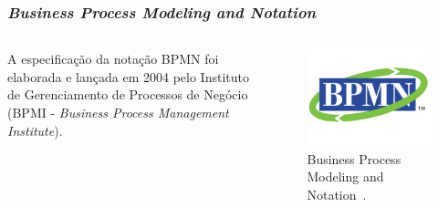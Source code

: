\documentclass[aspectratio=169]{beamer}
\begin{document}
\begin{frame}
\frametitle{\textit{Business Process Modeling and Notation}}

\begin{columns}
\begin{column}{0.5\textwidth}

A especificação da notação BPMN foi elaborada e lançada em 2004 pelo Instituto de Gerenciamento de Processos de Negócio (BPMI - \textit{Business Process Management Institute}).\\~\\

\end{column}

\begin{column}{0.5\textwidth}
\begin{figure}
\centering
\includegraphics[scale=0.22]{images/logo-bpmn.png}
\caption{Business Process Modeling and Notation~\cite{OMG}.}
\label{image:logo-bpmn}
\end{figure}
\end{column}
\end{columns}

\end{frame}
\end{document}
